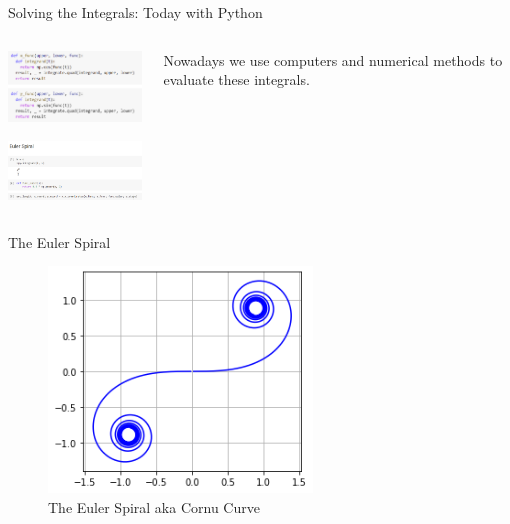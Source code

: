 \documentclass{beamer}
\begin{document}
\begin{frame}{Solving the Integrals: Today with Python}
	\begin{columns}
		\begin{column}{0.5\textwidth}
			\includegraphics[width=50mm, scale=0.5]{code_1.png}
			
			\includegraphics[width=50mm, scale=0.5]{code_2.png}
		\end{column}
		\begin{column}{0.5\textwidth}
		Nowadays we use computers and numerical methods to evaluate these integrals.
			
		\end{column}
	\end{columns}
\end{frame}


\begin{frame}{The Euler Spiral}
	\begin{figure}
		\caption{The Euler Spiral aka Cornu Curve}
		\centering
		\includegraphics[width=70mm, scale=0.5]{euler_spiral.png}
	\end{figure}
	
\end{frame}
\end{document}
